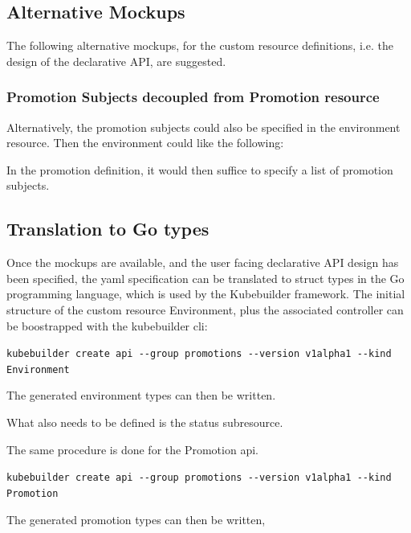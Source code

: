 \subsection{Alternative Mockups}

The following alternative mockups,
for the custom resource definitions,
i.e. the design of the declarative API,
are suggested.

\subsubsection*{Promotion Subjects decoupled from Promotion resource}

Alternatively, the promotion subjects could also be specified
in the environment resource.
Then the environment could like the following:



In the promotion definition,
it would then suffice to specify
a list of promotion subjects.



\subsection{Translation to Go types}

Once the mockups are available,
and the user facing declarative API design has been specified,
the yaml specification can be translated to struct types in the
Go programming language, which is used by the Kubebuilder framework.
The initial structure of the custom resource Environment,
plus the associated controller
can be boostrapped with the kubebuilder cli:

\lstinline|kubebuilder create api --group promotions --version v1alpha1 --kind Environment|

The generated environment types can then be written.



What also needs to be defined is the status subresource.



The same procedure is done for the Promotion api.

\lstinline|kubebuilder create api --group promotions --version v1alpha1 --kind Promotion|

The generated promotion types can then be written,

